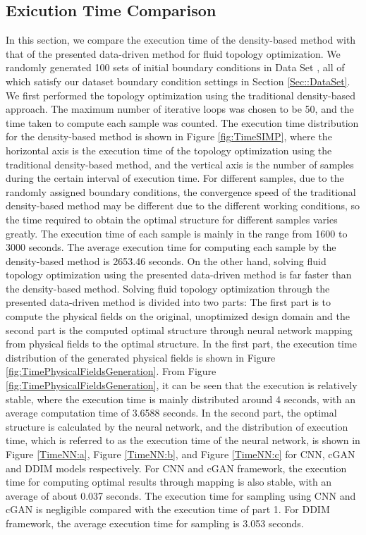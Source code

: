 \documentclass{article}
\begin{document}
\subsection{Exicution Time Comparison}
In this section, we compare the execution time of the density-based method with that of the presented data-driven method for fluid topology optimization.
We randomly generated 100 sets of initial boundary conditions in  Data Set \uppercase\expandafter{}, all of which satisfy our dataset boundary condition settings in Section \ref{Sec::DataSet}. We first performed the topology optimization using the traditional density-based approach. The maximum number of iterative loops was chosen to be 50, and the time taken to compute each sample was counted. The execution time distribution for the density-based method is shown in Figure \ref{fig:TimeSIMP}, where the horizontal axis is the execution time of the topology optimization using the traditional density-based method, and the vertical axis is the number of samples during the certain interval of execution time. For different samples, due to the randomly assigned boundary conditions, the convergence speed of the traditional density-based method may be different due to the different working conditions, so the time required to obtain the optimal structure for different samples varies greatly. The execution time of each sample is mainly in the range from 1600 to 3000 seconds. The average execution time for computing each sample by the density-based method is 2653.46 seconds. On the other hand, solving fluid topology optimization using the presented data-driven method is far faster than the density-based method.
Solving fluid topology optimization through the presented data-driven method is divided into two parts:
The first part is to compute the physical fields on the original, unoptimized design domain and the second part is the computed optimal structure through neural network mapping from physical fields to the optimal structure. 
In the first part,  the execution time distribution of the generated physical fields is shown in Figure \ref{fig:TimePhysicalFieldsGeneration}. From Figure \ref{fig:TimePhysicalFieldsGeneration}, it can be seen that the execution is relatively stable, where the execution time is mainly distributed around 4 seconds, with an average computation time of 3.6588 seconds. In the second part, the optimal structure is calculated by the neural network, and the distribution of execution time, which is referred to as the execution time of the neural network, is shown in Figure \ref{TimeNN:a}, Figure \ref{TimeNN:b}, and Figure \ref{TimeNN:c} for CNN, cGAN and DDIM models respectively.
For CNN and cGAN framework, the execution time for computing optimal results through mapping is also stable, with an average of about 0.037 seconds. The execution time for sampling using CNN and cGAN is negligible compared with the execution time of part 1. For DDIM framework, the average execution time for sampling is 3.053 seconds. 
 
\end{document}
